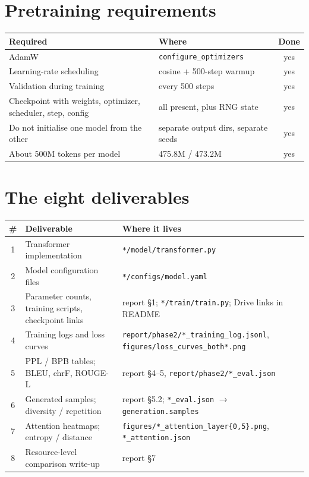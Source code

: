 \documentclass[11pt]{report}
\newcommand{\p}[1]{\texttt{#1}}
\begin{document}
\section{Pretraining requirements}

\begin{center}
\begin{tabular}{p{}p{}c}
\toprule
\textbf{Required} & \textbf{Where} & \textbf{Done} \\
\midrule
AdamW & \p{configure\_optimizers} & yes \\
Learning-rate scheduling & cosine + 500-step warmup & yes \\
Validation during training & every 500 steps & yes \\
Checkpoint with weights, optimizer, scheduler, step, config & all present, plus
RNG state & yes \\
Do not initialise one model from the other & separate output dirs, separate seeds & yes \\
About 500M tokens per model & 475.8M / 473.2M & yes \\
\bottomrule
\end{tabular}
\end{center}

\section{The eight deliverables}

\begin{center}
\begin{longtable}{cp{}p{}}
\toprule
\# & \textbf{Deliverable} & \textbf{Where it lives} \\
\midrule
\endhead
1 & Transformer implementation & \p{*/model/transformer.py} \\
2 & Model configuration files & \p{*/configs/model.yaml} \\
3 & Parameter counts, training scripts, checkpoint links &
    report §1; \p{*/train/train.py}; Drive links in README \\
4 & Training logs and loss curves &
    \p{report/phase2/*\_training\_log.jsonl}, \p{figures/loss\_curves\_both*.png} \\
5 & PPL / BPB tables; BLEU, chrF, ROUGE-L &
    report §4--5, \p{report/phase2/*\_eval.json} \\
6 & Generated samples; diversity / repetition &
    report §5.2; \p{*\_eval.json} $\to$ \p{generation.samples} \\
7 & Attention heatmaps; entropy / distance &
    \p{figures/*\_attention\_layer\{0,5\}.png}, \p{*\_attention.json} \\
8 & Resource-level comparison write-up & report §7 \\
\bottomrule
\end{longtable}
\end{center}
\end{document}
